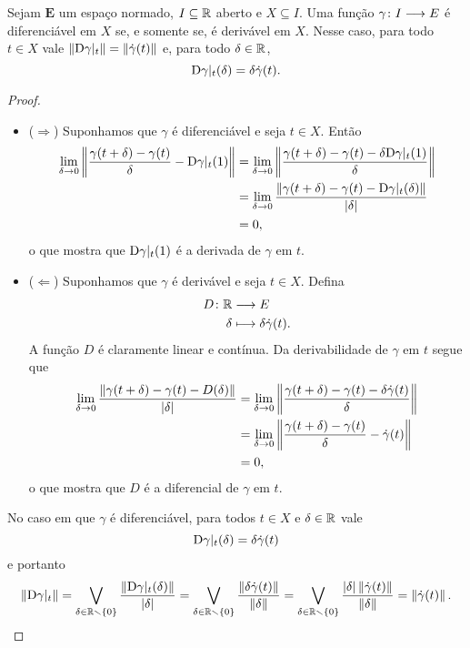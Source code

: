 \begin{proposition}
\label{prop:diferenciabilidade.derivabilidade}
Sejam $\bm E$ um espaço normado, $I \subseteq \mathbb{R}$ aberto e $X \subseteq I$. Uma função ${\gamma}\colon {I} \longrightarrow {E}$ é diferenciável em $X$ se, e somente se, é derivável em $X$. Nesse caso, para todo $t \in X$ vale $\left\Vert{\mathrm{D}\gamma|_t}\right\Vert = \left\Vert{\dot \gamma(t)}\right\Vert$ e, para todo $\delta \in \mathbb{R}$,
	\begin{equation*}
	\mathrm{D} \gamma|_t(\delta) = \delta\dot \gamma(t).
	\end{equation*}
\end{proposition}
\begin{proof}
	\begin{itemize}
	\item ($\Rightarrow$) Suponhamos que $\gamma$ é diferenciável e seja $t \in X$. Então
		\begin{align*}
		\lim_{\delta \to 0} \left\Vert{\frac{\gamma(t+\delta) - \gamma(t)}{\delta} - \mathrm{D}\gamma|_t(1)}\right\Vert &= \lim_{\delta \to 0} \left\Vert{\frac{\gamma(t+\delta) - \gamma(t) - \delta\mathrm{D}\gamma|_t(1)}{\delta}}\right\Vert \\
			&= \lim_{\delta \to 0} \frac{\left\Vert{\gamma(t+\delta) - \gamma(t) - \mathrm{D}\gamma|_t(\delta)}\right\Vert}{\left\vert{\delta}\right\vert} \\
			&= 0,
		\end{align*}
	o que mostra que $\mathrm{D} \gamma|_t(1)$ é a derivada de $\gamma$ em $t$.

	\item ($\Leftarrow$) Suponhamos que $\gamma$ é derivável e seja $t \in X$. Defina
		\begin{align*}
		{D}\colon {\mathbb{R}} &\longrightarrow {E} \\{\delta} &\longmapsto \delta \dot \gamma(t).
		\end{align*}
	A função $D$ é claramente linear e contínua. Da derivabilidade de $\gamma$ em $t$ segue que
		\begin{align*}
		\lim_{\delta \to 0} \frac{\left\Vert{\gamma(t+\delta) - \gamma(t) - D(\delta)}\right\Vert}{\left\vert{\delta}\right\vert} &= \lim_{\delta \to 0} \left\Vert{\frac{\gamma(t+\delta) - \gamma(t) - \delta \dot \gamma(t)}{\delta}}\right\Vert \\
			&= \lim_{\delta \to 0} \left\Vert{\frac{\gamma(t+\delta) - \gamma(t)}{\delta} - \dot \gamma(t)}\right\Vert \\
			&= 0,
		\end{align*}
	o que mostra que $D$ é a diferencial de $\gamma$ em $t$.
	\end{itemize}
No caso em que $\gamma$ é diferenciável, para todos $t \in X$ e $\delta \in \mathbb{R}$ vale
	\begin{equation*}
	\mathrm{D} \gamma|_t(\delta) = \delta\dot \gamma(t)
	\end{equation*}
e portanto
	\begin{equation*}
	\left\Vert{\mathrm{D}\gamma|_t}\right\Vert = \bigvee_{\delta \in \mathbb{R} \smallsetminus \{0\}} \frac{\left\Vert{\mathrm{D}\gamma|_t(\delta)}\right\Vert}{\left\vert{\delta}\right\vert} = \bigvee_{\delta \in \mathbb{R} \smallsetminus \{0\}} \frac{\left\Vert{\delta \dot \gamma(t)}\right\Vert}{\left\Vert{\delta}\right\Vert} = \bigvee_{\delta \in \mathbb{R} \smallsetminus \{0\}} \frac{\left\vert{\delta}\right\vert\left\Vert{\dot \gamma(t)}\right\Vert}{\left\Vert{\delta}\right\Vert} = \left\Vert{\dot \gamma(t)}\right\Vert.
	\qedhere
	\end{equation*}
\end{proof}

